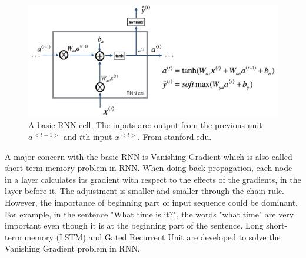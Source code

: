 \begin{figure}[h!]
\begin{center}
\includegraphics[width = 13cm]{img/basic_rnn.png}
\caption{A basic RNN cell. The inputs are: output from the previous unit $a^{<t-1>}$ and $t$th input $x^{<t>}$. From stanford.edu. \label{fig_RNN}}
\end{center}
\end{figure}

A major concern with the basic RNN is Vanishing Gradient \cite{pascanu2013difficulty} which is also called short term memory problem in RNN. When doing back propagation, each node in a layer calculates its gradient with respect to the effects of the gradients, in the layer before it. The adjustment is smaller and smaller through the chain rule. However, the importance of beginning part of input sequence could be dominant. For example, in the sentence "What time is it?", the words "what time" are very important even though it is at the beginning part of the sentence. Long short-term memory (LSTM) \cite{hochreiter1997long} and Gated Recurrent Unit \cite{cho2014learning} are developed to solve the Vanishing Gradient problem in RNN.

